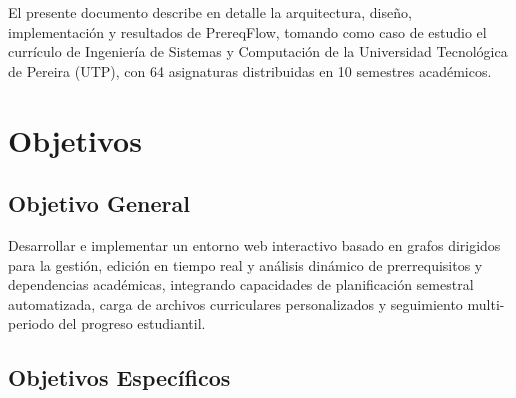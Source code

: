 \documentclass[12pt]{report}
\begin{document}
El presente documento describe en detalle la arquitectura, diseño, implementación y resultados de PrereqFlow, tomando como caso de estudio el currículo de Ingeniería de Sistemas y Computación de la Universidad Tecnológica de Pereira (UTP), con 64 asignaturas distribuidas en 10 semestres académicos.

\chapter{Objetivos}

\section{Objetivo General}

Desarrollar e implementar un entorno web interactivo basado en grafos dirigidos para la gestión, edición en tiempo real y análisis dinámico de prerrequisitos y dependencias académicas, integrando capacidades de planificación semestral automatizada, carga de archivos curriculares personalizados y seguimiento multi-periodo del progreso estudiantil.

\section{Objetivos Específicos}
\end{document}
